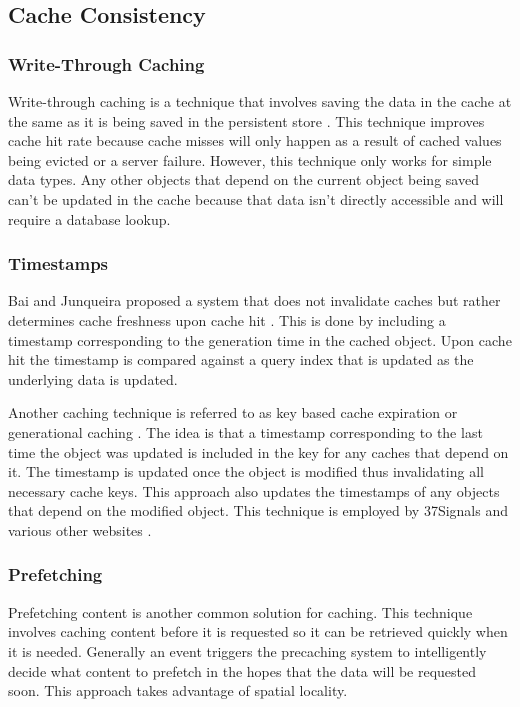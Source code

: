 \documentclass[12pt]{ucthesis}
\begin{document}
\subsection{Cache Consistency}
\subsubsection{Write-Through Caching}
Write-through caching is a technique that involves saving the data in the cache at the same as it is being saved in the persistent store \cite{writeThroughCaching}.
This technique improves cache hit rate because cache misses will only happen as a result of cached values being evicted or a server failure.
However, this technique only works for simple data types.
Any other objects that depend on the current object being saved can't be updated in the cache because that data isn't directly accessible and will require a database lookup.

\subsubsection{Timestamps}
Bai and Junqueira proposed a system that does not invalidate caches but rather determines cache freshness upon cache hit \cite{cacheInvalidationWebSearch}.
This is done by including a timestamp corresponding to the generation time in the cached object.
Upon cache hit the timestamp is compared against a query index that is updated as the underlying data is updated.

Another caching technique is referred to as key based cache expiration \cite{keyBasedCacheExpiration} or generational caching \cite{generationalCaching}.
The idea is that a timestamp corresponding to the last time the object was updated is included in the key for any caches that depend on it.
The timestamp is updated once the object is modified thus invalidating all necessary cache keys.
This approach also updates the timestamps of any objects that depend on the modified object.
This technique is employed by 37Signals and various other websites \cite{keyBasedCacheExpiration}.

\subsubsection{Prefetching}
Prefetching content is another common solution for caching.
This technique involves caching content before it is requested so it can be retrieved quickly when it is needed.
Generally an event triggers the precaching system to intelligently decide what content to prefetch in the hopes that the data will be requested soon.
This approach takes advantage of spatial locality.
\end{document}
